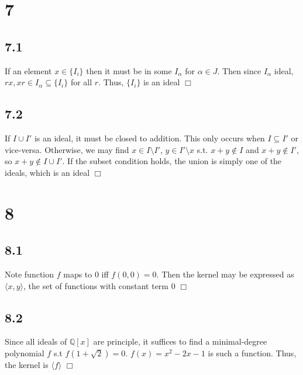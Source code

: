 \documentclass{article}
\begin{document}
\section*{7}
\subsection*{7.1}
If an element $x \in \{I_i\}$ then it must be in some $I_\alpha$ for $\alpha \in J$. Then since $I_\alpha$ ideal, $rx, xr \in I_\alpha \subseteq \{I_i\}$ for all $r$. Thus, $\{I_i\}$ is an ideal $\Box$
\subsection*{7.2}
If $I\cup I'$ is an ideal, it must be closed to addition. This only occurs when $I \subseteq I'$ or vice-versa. Otherwise, we may find $x \in I \setminus I'$, $y \in I' \setminus x$ s.t. $x+y \notin I$ and $x+y \notin I'$, so $x+y \notin I \cup I'$. If the subset condition holds, the union is simply one of the ideals, which is an ideal $\Box$

\section*{8}
\subsection*{8.1}
Note function $f$ maps to 0 iff $f(0,0) = 0$. Then the kernel may be expressed as $\langle x,y\rangle$, the set of functions with constant term 0 $\Box$
\subsection*{8.2}
Since all ideals of $\mathbb{Q}[x]$ are principle, it suffices to find a minimal-degree polynomial $f$ s.t $f(1+\sqrt{2}) = 0$. $f(x) = x^2-2x-1$ is such a function. Thus, the kernel is $\langle f \rangle$ $\Box$
\end{document}
